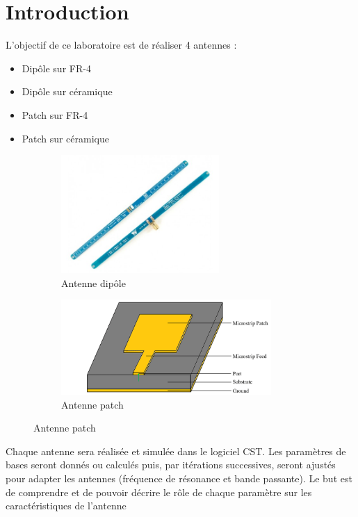 \documentclass[Deriaz_Traiber_Labo02.tex]{subfiles}
\begin{document}
\chapter{Introduction}
L'objectif de ce laboratoire est de réaliser 4 antennes :
\begin{itemize}
\item Dipôle sur FR-4
\item Dipôle sur céramique
\item Patch sur FR-4
\item Patch sur céramique
\end{itemize}
\begin{figure}[H]
\centering
\begin{subfigure}{0.5\textwidth}
\centering
\includegraphics[width=6cm]{Figure/antenne_dipole.jpg}
\caption[caption]{Antenne dipôle\footnotemark}
\end{subfigure}
\begin{subfigure}{0.5\textwidth}
\centering
\includegraphics[width=8cm]{Figure/antenne_patch.png}
\caption[caption]{Antenne patch\footnotemark}
\end{subfigure}
\end{figure}


Chaque antenne sera réalisée et simulée dans le logiciel CST. Les paramètres de bases seront donnés ou calculés puis, par itérations successives, seront ajustés pour adapter les antennes (fréquence de résonance et bande passante). Le but est de comprendre et de pouvoir décrire le rôle de chaque paramètre sur les caractéristiques de l'antenne
\end{document}
